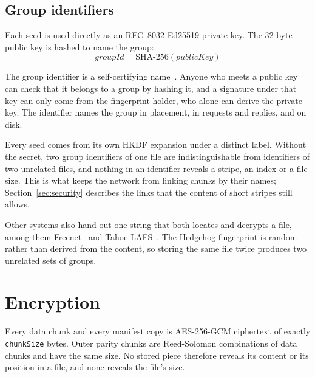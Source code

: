 \documentclass[10pt,a4paper,final]{article}
\newcommand{\code}[1]{\texttt{#1}}
\begin{document}
\subsection{Group identifiers}

Each seed is used directly as an RFC~8032 Ed25519 private key. The 32-byte public key is hashed to name the group:
\begin{equation}
	\mathit{groupId} = \mathrm{SHA\text{-}256}(\mathit{publicKey})
\end{equation}

The group identifier is a self-certifying name~\cite{mazieres1999}. Anyone who meets a public key can check that it
belongs to a group by hashing it, and a signature under that key can only come from the fingerprint holder, who
alone can derive the private key. The identifier names the group in placement, in requests and replies, and on
disk.

Every seed comes from its own HKDF expansion under a distinct label. Without the secret, two group identifiers of
one file are indistinguishable from identifiers of two unrelated files, and nothing in an identifier reveals a
stripe, an index or a file size. This is what keeps the network from linking chunks by their names;
Section~\ref{sec:security} describes the links that the content of short stripes still allows.

Other systems also hand out one string that both locates and decrypts a file, among them Freenet~\cite{clarke2001}
and Tahoe-LAFS~\cite{wilcox2008}. The Hedgehog fingerprint is random rather than derived from the content, so
storing the same file twice produces two unrelated sets of groups.

\section{Encryption}
\label{sec:encryption}

Every data chunk and every manifest copy is AES-256-GCM ciphertext of exactly \code{chunkSize} bytes. Outer parity
chunks are Reed-Solomon combinations of data chunks and have the same size. No stored piece therefore reveals its
content or its position in a file, and none reveals the file's size.
\end{document}
